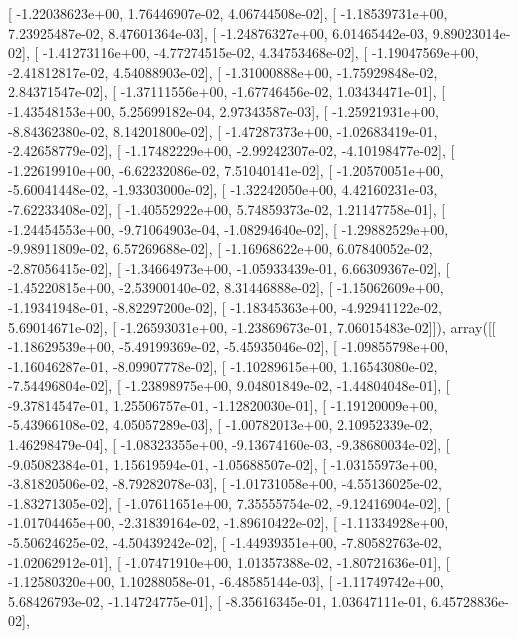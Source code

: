 \documentclass{article}
\begin{document}
       [ -1.22038623e+00,   1.76446907e-02,   4.06744508e-02],
       [ -1.18539731e+00,   7.23925487e-02,   8.47601364e-03],
       [ -1.24876327e+00,   6.01465442e-03,   9.89023014e-02],
       [ -1.41273116e+00,  -4.77274515e-02,   4.34753468e-02],
       [ -1.19047569e+00,  -2.41812817e-02,   4.54088903e-02],
       [ -1.31000888e+00,  -1.75929848e-02,   2.84371547e-02],
       [ -1.37111556e+00,  -1.67746456e-02,   1.03434471e-01],
       [ -1.43548153e+00,   5.25699182e-04,   2.97343587e-03],
       [ -1.25921931e+00,  -8.84362380e-02,   8.14201800e-02],
       [ -1.47287373e+00,  -1.02683419e-01,  -2.42658779e-02],
       [ -1.17482229e+00,  -2.99242307e-02,  -4.10198477e-02],
       [ -1.22619910e+00,  -6.62232086e-02,   7.51040141e-02],
       [ -1.20570051e+00,  -5.60041448e-02,  -1.93303000e-02],
       [ -1.32242050e+00,   4.42160231e-03,  -7.62233408e-02],
       [ -1.40552922e+00,   5.74859373e-02,   1.21147758e-01],
       [ -1.24454553e+00,  -9.71064903e-04,  -1.08294640e-02],
       [ -1.29882529e+00,  -9.98911809e-02,   6.57269688e-02],
       [ -1.16968622e+00,   6.07840052e-02,  -2.87056415e-02],
       [ -1.34664973e+00,  -1.05933439e-01,   6.66309367e-02],
       [ -1.45220815e+00,  -2.53900140e-02,   8.31446888e-02],
       [ -1.15062609e+00,  -1.19341948e-01,  -8.82297200e-02],
       [ -1.18345363e+00,  -4.92941122e-02,   5.69014671e-02],
       [ -1.26593031e+00,  -1.23869673e-01,   7.06015483e-02]]), array([[ -1.18629539e+00,  -5.49199369e-02,  -5.45935046e-02],
       [ -1.09855798e+00,  -1.16046287e-01,  -8.09907778e-02],
       [ -1.10289615e+00,   1.16543080e-02,  -7.54496804e-02],
       [ -1.23898975e+00,   9.04801849e-02,  -1.44804048e-01],
       [ -9.37814547e-01,   1.25506757e-01,  -1.12820030e-01],
       [ -1.19120009e+00,  -5.43966108e-02,   4.05057289e-03],
       [ -1.00782013e+00,   2.10952339e-02,   1.46298479e-04],
       [ -1.08323355e+00,  -9.13674160e-03,  -9.38680034e-02],
       [ -9.05082384e-01,   1.15619594e-01,  -1.05688507e-02],
       [ -1.03155973e+00,  -3.81820506e-02,  -8.79282078e-03],
       [ -1.01731058e+00,  -4.55136025e-02,  -1.83271305e-02],
       [ -1.07611651e+00,   7.35555754e-02,  -9.12416904e-02],
       [ -1.01704465e+00,  -2.31839164e-02,  -1.89610422e-02],
       [ -1.11334928e+00,  -5.50624625e-02,  -4.50439242e-02],
       [ -1.44939351e+00,  -7.80582763e-02,  -1.02062912e-01],
       [ -1.07471910e+00,   1.01357388e-02,  -1.80721636e-01],
       [ -1.12580320e+00,   1.10288058e-01,  -6.48585144e-03],
       [ -1.11749742e+00,   5.68426793e-02,  -1.14724775e-01],
       [ -8.35616345e-01,   1.03647111e-01,   6.45728836e-02],
\end{document}
